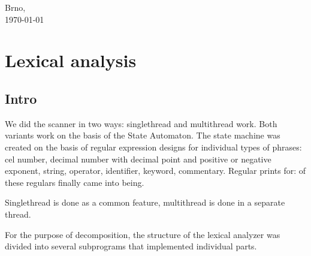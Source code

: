 \documentclass[12pt,a4paper,titlepage]{report}
\begin{document}
\begin{titlepage}

\vspace{3.0cm}

\begin{center}
\normalsize Brno,\\
{\normalsize\today} %
\end{center}

\newpage
\end{titlepage}



\tableofcontents  %
\thispagestyle{empty}
\newpage




\section{Lexical analysis}                                            %
    \subsection{Intro}

\begin{justify}
We did the scanner in two ways: singlethread and multithread work. Both variants work on the basis of the State Automaton.
The state machine was created on the basis of regular expression designs for individual types of phrases: cel number, decimal number with decimal point and positive or negative exponent, string, operator, identifier, keyword, commentary.\justify
Regular prints for:
of these regulars finally came into being.\justify

Singlethread is done as a common feature, multithread is done in a separate thread.\justify

For the purpose of decomposition, the structure of the lexical analyzer was divided into several subprograms that implemented individual parts.
\end{justify}
\end{document}
